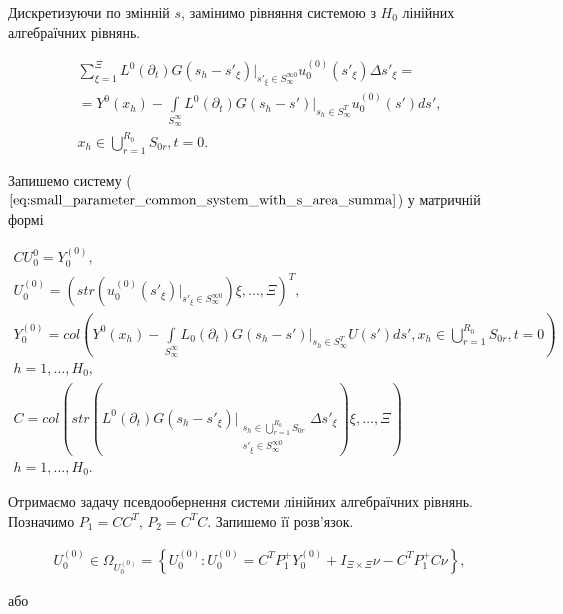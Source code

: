 Дискретизуючи по змінній $s$, замінимо  рівняння  системою з $H_{0}$ лінійних алгебраїчних рівнянь.

\begin{equation}
    \begin{alignedat}{2}
    \label{eq:small_parameter_common_system_with_s_area_summa}
    \sum\limits_{\xi=1}^{\Xi} L^{0}(\partial_{t})G(s_{h}-s'_{\xi})\bigg|_{s'_{\xi}\in S_{\infty}^{\infty 0}}
    u_{0}^{(0)}(s'_{\xi})\Delta s'_{\xi} =\\
    = Y^{0}(x_{h}) - \int\limits_{S_{\infty}^{\infty}} L^{0}(\partial_{t})G(s_{h}-s') \bigg|_{s_{h}\in S_{\infty}^{T}} u_{0}^{(0)}(s')ds',\\
    x_{h}\in\bigcup\limits_{r=1}^{R_{0}} S_{0r},t=0.
    \end{alignedat}
\end{equation}

Запишемо систему ($\ref{eq:small_parameter_common_system_with_s_area_summa}$) у матричній формі

\begin{gather*}
    CU_{0}^{0}=Y_{0}^{(0)},\\
    U_{0}^{(0)} = \left( str \left( u_{0}^{(0)}(s'_{\xi})\bigg|_{s'_{\xi}\in S_{\infty}^{\infty 0}} \right) \xi,\dots,{\Xi} \right)^{T},\\
    Y_{0}^{(0)}=col\left(Y^{0}(x_{h}) - \int\limits_{S_{\infty}^{\infty}} L_{0}(\partial_{t})G(s_{h}-s')\bigg|_{s_{h}\in S_{\infty}
    ^{T}}U(s')ds', x_{h}\in\bigcup\limits_{r=1}^{R_{0}} S_{0r},t=0 \right)\\ h=1,\dots,H_{0},\\
    C=col\left( str\left(L^{0}(\partial_{t})G(s_{h}-s'_{\xi})\bigg|_{\substack{s_{h}\in\bigcup
    \limits_{r=1}^{R_{0}} S_{0r}\\
    s'_{\xi}\in S_{\infty}^{\infty 0}}} \Delta s'_{\xi} \right)\xi,\dots,{\Xi} \right)\\ h=1,\dots,H_{0}.
\end{gather*}

Отримаємо задачу псевдообернення системи лінійних алгебраїчних рівнянь.
Позначимо $P_{1}=CC^{T}$, $P_{2}=C^{T}C$. Запишемо її розв'язок.

\begin{gather*}
    U_{0}^{(0)}\in \Omega_{U_{0}^{(0)}} = \left\{U_{0}^{(0)} : U_{0}^{(0)} = C^{T}P_{1}^{+}Y_{0}^{(0)}
    + I_{\Xi\times\Xi}\nu -C^{T}P_{1}^{+}C\nu\right\},
\end{gather*}

або

